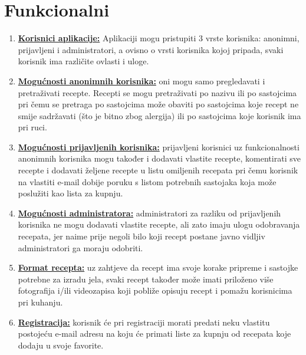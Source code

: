 \documentclass[times, utf8, zavrsni]{fer}
\begin{document}
\section{Funkcionalni}
\begin{enumerate}
      \item \textbf{\underline{Korisnici aplikacije:}} Aplikaciji mogu pristupiti 3 vrste korisnika:
            anonimni, prijavljeni i administratori, a ovisno o vrsti korisnika kojoj pripada, svaki korisnik ima
            različite ovlasti i uloge.
      \item \textbf{\underline{Mogućnosti anonimnih korisnika:}} oni mogu samo pregledavati i pretraživati
            recepte. Recepti se mogu pretraživati po nazivu ili po sastojcima pri čemu se pretraga po
            sastojcima može obaviti po sastojcima koje recept ne smije sadržavati (što je bitno zbog
            alergija) ili po sastojcima koje korisnik ima pri ruci.
      \item \textbf{\underline{Mogućnosti prijavljenih korisnika:}} prijavljeni korisnici uz funkcionalnosti \linebreak
            anonimnih korisnika mogu također i dodavati vlastite recepte, komentirati sve recepte
            i dodavati željene recepte u listu omiljenih recepata pri čemu korisnik na vlastiti e-mail
            dobije poruku s listom potrebnih sastojaka koja može poslužiti kao lista za kupnju.
      \item \textbf{\underline{Mogućnosti administratora:}} administratori za razliku od prijavljenih
            korisnika ne mogu dodavati vlastite recepte, ali zato imaju ulogu odobravanja recepata, jer
            naime prije negoli bilo koji recept postane javno vidljiv administratori ga moraju odobriti.
      \item \textbf{\underline{Format recepta:}} uz zahtjeve da recept ima svoje korake pripreme i
            sastojke potrebne za izradu jela, svaki recept također može imati priloženo više fotografija
            i/ili videozapisa koji pobliže opisuju recept i pomažu korisnicima pri kuhanju.
      \item \textbf{\underline{Registracija:}} korisnik će pri registraciji morati predati neku vlastitu
            postojeću e-mail adresu na koju će primati liste za kupnju od recepata koje dodaju u svoje favorite.
\end{enumerate}
\end{document}
